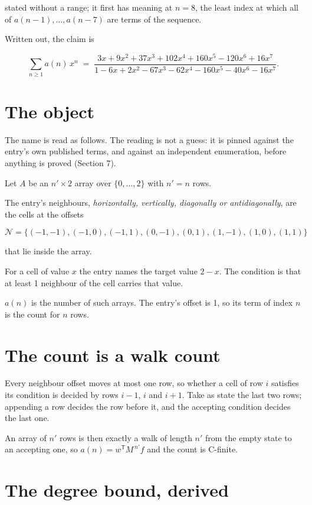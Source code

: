 \documentclass[11pt]{article}
\theoremstyle{definition}
\begin{document}
stated without a range; it first has meaning at $n = 8$, the least index at which all of $a(n-1),\dots,a(n-7)$ are terms of the sequence.

Written out, the claim is

\[\sum_{n \ge 1} a(n)\,x^n \;=\; \frac{3x + 9x^{2} + 37x^{3} + 102x^{4} + 160x^{5} - 120x^{6} + 16x^{7}}{1 - 6x + 2x^{2} - 67x^{3} - 62x^{4} - 160x^{5} - 40x^{6} - 16x^{7}}.\]

\section{The object}

The name is read as follows. The reading is not a guess: it is pinned against the entry's own published terms, and against an independent enumeration, before anything is proved (Section 7).

Let $A$ be an $n' \times 2$ array over $\{0,\dots,2\}$ with $n' = n$ rows.

The entry's neighbours, {\itshape horizontally, vertically, diagonally or antidiagonally}, are the cells at the offsets

\[\mathcal{N} = \{(-1,-1), (-1,0), (-1,1), (0,-1), (0,1), (1,-1), (1,0), (1,1)\}\]

that lie inside the array.

For a cell of value $x$ the entry names the target value $2 - x$. The condition is that at least 1 neighbour of the cell carries that value.

$a(n)$ is the number of such arrays. The entry's offset is 1, so its term of index $n$ is the count for $n$ rows.

\section{The count is a walk count}

Every neighbour offset moves at most one row, so whether a cell of row $i$ satisfies its condition is decided by rows $i-1$, $i$ and $i+1$. Take as state the last two rows; appending a row decides the row before it, and the accepting condition decides the last one.

An array of $n'$ rows is then exactly a walk of length $n'$ from the empty state to an accepting one, so $a(n) = w^{\mathsf T}M^{\,n'}f$ and the count is C-finite.

\section{The degree bound, derived}
\end{document}
